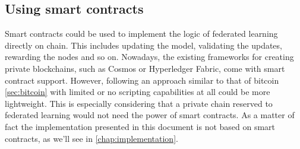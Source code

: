 \subsection{Using smart contracts} Smart contracts could be used to implement the logic of federated learning
directly on chain. This includes updating the model, validating the updates, rewarding the nodes and so on.
Nowadays, the existing frameworks for creating private blockchains, such as Cosmos or Hyperledger Fabric,
come with smart contract support.
However, following an approach similar to that of bitcoin \ref{sec:bitcoin} with limited or no scripting
capabilities at all could be more lightweight. This is especially considering that a private chain reserved
to federated learning would not need the power of smart contracts.
As a matter of fact the implementation presented in this document is not based on smart contracts, as we'll
see in \ref{chap:implementation}.

